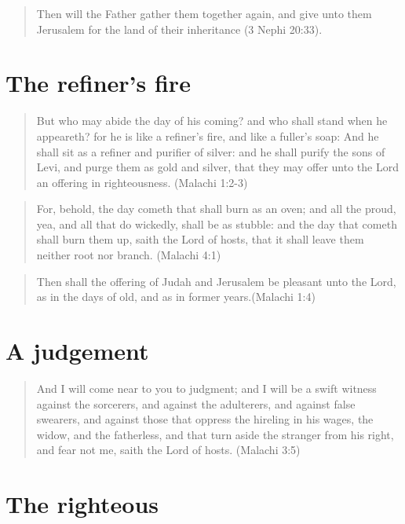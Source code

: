 \begin{quotation}
Then will the Father gather them together again, and give unto them Jerusalem for the land of their inheritance (3 Nephi 20:33).
\end{quotation}


\section{The refiner's fire}

\begin{quotation}
But who may abide the day of his coming? and who shall stand when he appeareth? for he is like a refiner's fire, and like a fuller's soap: And he shall sit as a refiner and purifier of silver: and he shall purify the sons of Levi, and purge them as gold and silver, that they may offer unto the Lord an offering in righteousness. (Malachi 1:2-3)
\end{quotation}

\begin{quotation}
For, behold, the day cometh that shall burn as an oven; and all the proud, yea, and all that do wickedly, shall be as stubble: and the day that cometh shall burn them up, saith the Lord of hosts, that it shall leave them neither root nor branch. (Malachi 4:1)
\end{quotation}

\begin{quotation}
Then shall the offering of Judah and Jerusalem be pleasant unto the Lord, as in the days of old, and as in former years.(Malachi 1:4)
\end{quotation}


\section{A judgement}

\begin{quotation}
And I will come near to you to judgment; and I will be a swift witness against the sorcerers, and against the adulterers, and against false swearers, and against those that oppress the hireling in his wages, the widow, and the fatherless, and that turn aside the stranger from his right, and fear not me, saith the Lord of hosts. (Malachi 3:5)
\end{quotation}


\section{The righteous}

